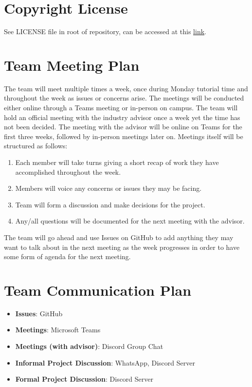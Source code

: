 \documentclass{article}
\begin{document}
\section{Copyright License}

See LICENSE file in root of repository, can be accessed at this \href{https://github.com/ssm-lab/capstone--source-code-optimizer/blob/main/LICENSE}{link}.

\section{Team Meeting Plan}

\hspace{\parindent} The team will meet multiple times a week, once during Monday tutorial time and throughout the week as issues or concerns arise. The meetings will be conducted either online through a Teams meeting or in-person on campus. The team
will hold an official meeting with the industry advisor once a week yet the time has not been decided. The meeting with the advisor will be online on Teams for the first three weeks, followed by in-person meetings later on. Meetings itself will be structured as follows:
\begin{enumerate}
  \item Each member will take turns giving a short recap of work they have accomplished throughout the week.
  \item Members will voice any concerns or issues they may be facing.
  \item Team will form a discussion and make decisions for the project.
  \item Any/all questions will be documented for the next meeting with the advisor.
\end{enumerate}
The team will go ahead and use Issues on GitHub to add anything they may want to talk about in the next meeting as the week progresses in order to have some form of agenda for the next meeting.

\section{Team Communication Plan}

\begin{itemize}

    \item \textbf{Issues}: GitHub 
    \item \textbf{Meetings}: Microsoft Teams 
    \item \textbf{Meetings (with advisor)}: Discord Group Chat
    \item \textbf{Informal Project Discussion}: WhatsApp, Discord Server
    \item \textbf{Formal Project Discussion}: Discord Server
    
\end{itemize}
\end{document}
